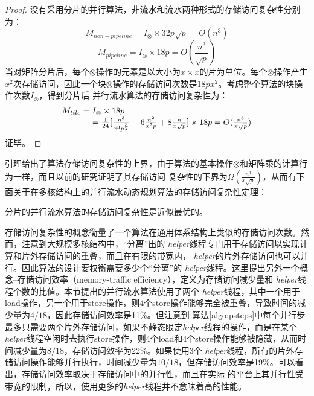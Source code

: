 \begin{flushleft}
\begin{proof}
	没有采用分片的并行算法，非流水和流水两种形式的存储访问复杂性分别为：
	\begin{displaymath}
	M_{non-pipeline} = I_{\otimes}\times 32p\sqrt{p} = O(n^{3})
	\end{displaymath}
	\begin{displaymath}
	M_{pipeline} = I_{\otimes}\times 18p = O(\frac{n^{3}}{\sqrt{p}})
	\end{displaymath}
	当对矩阵分片后，每个$\otimes$操作的元素是以大小为$x\times
	x$的片为单位。每个$\otimes$操作产生$x^{2}$次存储访问，因此一个块$\otimes$操作的存储访问次数是$18px^{2}$。考虑整个算法的块操作次数$I_{\otimes}$，得到分片后
	并行流水算法的存储访问复杂性为：
	\begin{displaymath}
	\begin{array}{ll}
	M_{tile} = I_{\otimes}\times 18p \\
	\hspace*{3pc}= \frac{1}{24}[\frac{n^{3}}{x^{3}p^{\frac{3}{2}}}-6\frac{n^{2}}{x^{2}p}+8\frac{n}{x\sqrt{p}}]\times 18p=O(\frac{n^{3}}{x\sqrt{p}})
	\end{array}
	\end{displaymath}
	证毕。
\end{proof}
引理\label{lemma:memory_complexity}给出了算法存储访问复杂性的上界，由于算法的基本操作$\otimes$和矩阵乘的计算行为一样，而且以前的研究证明了其存储访问
复杂性的下界为$\Omega(\frac{n^{3}}{x\sqrt{p}})$\citep{layout-tpds03}，从而有下面关于在多核结构上的并行流水动态规划算法的存储访问复杂性定理：
\begin{theorem}
	分片的并行流水算法的存储访问复杂性是近似最优的。
\end{theorem}
存储访问复杂性的概念衡量了一个算法在通用体系结构上类似的存储访问次数。然而，注意到大规模多核结构中，“分离”出的{\em
	helper}线程专门用于存储访问以实现计算和片外存储访问的重叠，而且在有限的带宽内，{\em
	helper}的片外存储访问也可以并行。因此算法的设计要权衡需要多少个“分离”的{\em
	helper}线程。这里提出另外一个概念--存储访问效率（memory-traffic efficiency），定义为存储访问减少量和{\em
	helper}线程个数的比值。本节提出的并行流水算法使用了两个{\em
	helper}线程，其中一个用于load操作，另一个用于store操作，则4个store操作能够完全被重叠，导致时间的减少量为$4/18$，因此存储访问效率是11\%。但注意到
算法\ref{algo:psteps}中每个并行步最多只需要两个片外存储访问，如果不静态限定{\em helper}线程的操作，而是在某个{\em
	helper}线程空闲时去执行store操作，则4个load和4个store操作能够被隐藏，从而时间减少量为$8/18$，存储访问效率为22\%。如果使用3个{\em
	helper}线程，所有的片外存储访问操作能够并行执行，时间减少量为$10/18$，但存储访问效率是19\%。可以看出，存储访问效率取决于存储访问中的并行性，而且在实际
的平台上其并行性受带宽的限制，所以，使用更多的{\em helper}线程并不意味着高的性能。

\end{flushleft}

